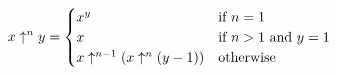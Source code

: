\documentclass[10pt]{amsart}
\theoremstyle{plain} %
\theoremstyle{definition}
\theoremstyle{remark}
\begin{document}
\title{}
\author{Andrew Robbins}
\date{2006-MM-DD}
\begin{equation}\notag
x \uparrow^{n} y = 
\begin{cases}
x^y & \text{if } n = 1\\
x & \text{if } n > 1 \text{ and }  y = 1\\
x \uparrow^{n-1} (x \uparrow^{n} (y-1)) & \text{otherwise}
\end{cases}
\end{equation}
\end{document}

